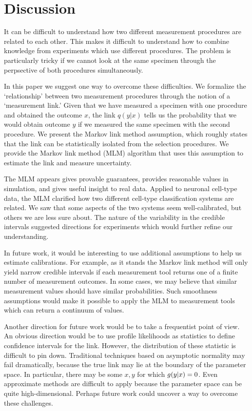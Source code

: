 \section{Discussion}

It can be difficult to understand how two different measurement procedures are related to each other.  This makes it difficult to understand how to combine knowledge from experiments which use different procedures.  The problem is particularly tricky if we cannot look at the same specimen through the perpsective of both procedures simultaneously.

In this paper we suggest one way to overcome these difficulties.  We formalize the `relationship' between two measurement procedures through the notion of a `measurement link.'  Given that we have measured a specimen with one procedure and obtained the outcome $x$, the link $q(y|x)$ tells us the probability that we would obtain outcome $y$ if we measured the same specimen with the second procedure.  We present the Markov link method assumption, which roughly states that the link can be statistically isolated from the selection procedures.  We provide the Markov link method (MLM) algorithm that uses this assumption to estimate the link and measure uncertainty.

The MLM appears gives provable guarantees, provides reasonable values in simulation, and gives useful insight to real data.  Applied to neuronal cell-type data, the MLM clarified how two different cell-type classification systems are related.  We saw that some aspects of the two systems seem well-calibrated, but others we are less sure about.  The nature of the variability in the credible intervals suggested directions for experiments which would further refine our understanding.  

In future work, it would be interesting to use additional assumptions to help us estimate calibrations.  For example, as it stands the Markov link method will only yield narrow credible intervals if each measurement tool returns one of a finite number of measurement outcomes.  In some cases, we may believe that similar measurement values should have similar probabilities.  Such smoothness assumptions would make it possible to apply the MLM to measurement tools which can return a continuum of values.   

Another direction for future work would be to take a frequentist point of view.  An obvious direction would be to use profile likelihoods as statistics to define confidence intervals for the link.  However, the distribution of these statistic is difficult to pin down.  Traditional techniques based on asymptotic normality may fail dramatically, because the true link may lie at the boundary of the parameter space.  In particular, there may be some $x,y$ for which $g(y|x)=0$.  Even approximate methods are difficult to apply because the parameter space can be quite high-dimensional.  Perhaps future work could uncover a way to overcome these challenges.

